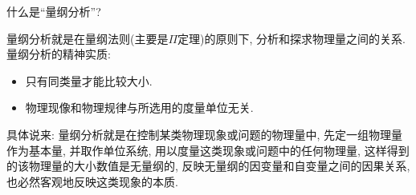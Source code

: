 \begin{problem}[01]
什么是``量纲分析''?
\end{problem}
\begin{solution}
量纲分析就是在量纲法则(主要是$\Pi$定理)的原则下, 分析和探求物理量之间的关系. 量纲分析的精神实质:
\begin{itemize}
\item 只有同类量才能比较大小.
\item 物理现像和物理规律与所选用的度量单位无关.
\end{itemize}
具体说来: 量纲分析就是在控制某类物理现象或问题的物理量中, 先定一组物理量作为基本量, 并取作单位系统, 用以度量这类现象或问题中的任何物理量, 这样得到的该物理量的大小数值是无量纲的, 反映无量纲的因变量和自变量之间的因果关系, 也必然客观地反映这类现象的本质.
\end{solution}
